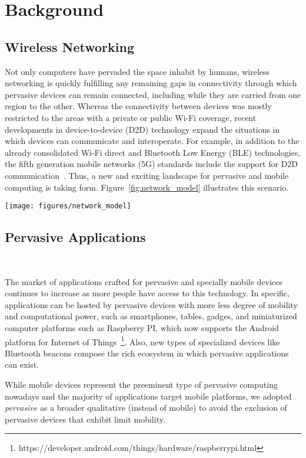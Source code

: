 \section{Background}\label{sec:background}


\subsection{Wireless Networking}

Not only computers have pervaded the space inhabit by humans, wireless networking is quickly fulfilling any remaining gaps in connectivity through which pervasive devices can remain connected, including while they are carried from one region to the other. Whereas the connectivity between devices was mostly restricted to the areas with a private or public Wi-Fi coverage, recent developments in device-to-device (D2D) technology expand the situations in which devices can communicate and interoperate. For example, in addition to the already consolidated Wi-Fi direct and Bluetooth Low Energy (BLE) technologies, the fifth generation mobile networks (5G) standards include the support for D2D communication~\cite{Tehrani:2014}. Thus, a new and exciting landscape for pervasive and mobile computing is taking form. Figure~\ref{fig:network_model} illustrates this scenario.

\begin{figure*}[t!]
	\centering
	\texttt{[image: figures/network\_model]}
	\caption{Application nodes communicating through Wi-Fi or D2D technologies}
	\label{fig:network_model}
\end{figure*}

\subsection{Pervasive Applications}~\label{sec:characterization}

The market of applications crafted for pervasive and specially mobile devices continues to increase as more people have access to this technology. In specific, applications can be hosted by pervasive devices with more less degree of mobility and computational power, such as smartphones, tables, gadges, and miniaturized computer platforms such as Raspberry PI, which now supports the Android platform for Internet of Things~\footnote{https://developer.android.com/things/hardware/raspberrypi.html}. Also, new types of specialized devices like Bluetooth beacons compose the rich ecosystem in which pervasive applications can exist.

While mobile devices represent the preeminent type of pervasive computing nowadays and the majority of applications target mobile platforms, we adopted \textit{pervasive} as a broader qualitative (instead of mobile) to avoid the exclusion of pervasive devices that exhibit limit mobility. 


